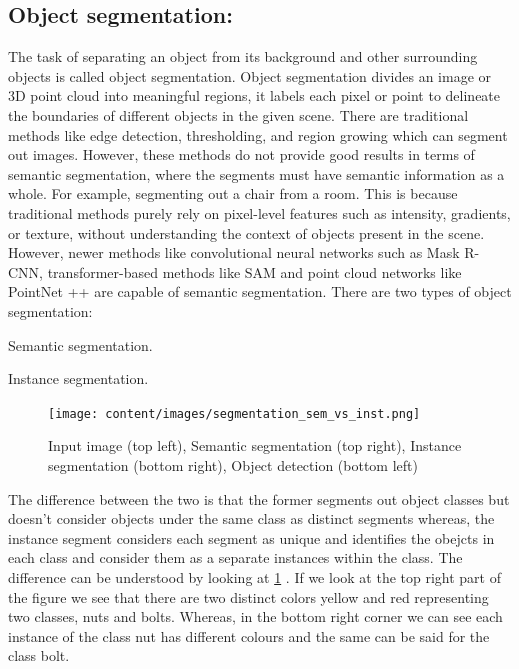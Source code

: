 \subsection{Object segmentation:}
The task of separating an object from its background and other surrounding objects is called object segmentation. Object segmentation divides an image or 3D point cloud
 into meaningful regions, it labels each pixel or point to delineate the boundaries of different objects in the given scene. There are traditional methods like edge detection, 
 thresholding, and region growing which can segment out images. However, these methods do not provide good results in terms of semantic segmentation, where the segments must 
 have semantic information as a whole. For example, segmenting out a chair from a room. This is because traditional methods purely rely on 
 pixel-level features such as intensity, gradients, or texture, without understanding the context of objects present in the scene. However, newer methods like convolutional
 neural networks such as Mask R-CNN, transformer-based methods like SAM and point cloud networks like PointNet ++ are capable of semantic segmentation. 
 There are two types of object segmentation:
 \begin{compactenum}[1.]
    \item	Semantic segmentation.
    \item	Instance segmentation.
 \end{compactenum}
\begin{figure}[ht!]
    \centering
    \texttt{[image: content/images/segmentation\_sem\_vs\_inst.png]}
    \caption{Input image (top left), Semantic segmentation (top right), Instance segmentation (bottom right), Object detection (bottom left)}
    \label{fig:segmentation_sem_vs_inst}
\end{figure}
The difference between the two is that the former segments out object classes but doesn't consider objects under the same class as distinct segments whereas, the instance segment 
considers each segment as unique and identifies the obejcts in each class and consider them as a separate instances within the class. The difference can be understood by looking at 
\cref{fig:segmentation_sem_vs_inst} \cite{Sharma2022}. If we look at the top right part of the figure we see that there are two distinct colors yellow and red representing two
classes, nuts and bolts. Whereas, in the bottom right corner we can see each instance of the class nut has different colours and the same can be said for the class bolt.
